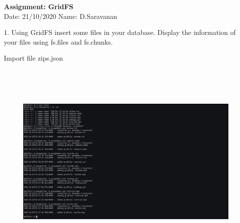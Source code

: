 \documentclass[a4paper,11pt,openright]{report}
\begin{document}
\singlespacing
\pagestyle{plain}

\begin{small}
\begin{center}
\textbf{Assignment: GridFS} \\
Date: 21/10/2020 \hspace{2mm} Name: D.Saravanan
\end{center}
\end{small}

\vspace{10px}

\begin{footnotesize}
1. Using GridFS insert some files in your database. Display the information of your files
using fs.files and fs.chunks.
\end{footnotesize}

{\footnotesize Import file zips.json}
\begin{figure}[ht!]
\includegraphics[width=20cm,height=10cm,keepaspectratio]{image1.pdf}
\centering
\end{figure}
\end{document}
